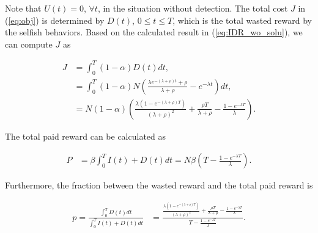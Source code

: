 Note that $U(t)=0$, $\forall t$,
in the situation without detection.
The total cost $J$ in (\ref{eq:obj}) is determined by $D(t)$, $0 \le t \le T$,
which is the total wasted reward by the selfish behaviors.
Based on the calculated result in (\ref{eq:IDR_wo_solu}),
we can compute $J$ as
\begin{small}
\begin{equation}
\label{eq:IDR_wo_J}
\begin{aligned}
J &= \int_{0}^{T} (1-\alpha) D(t) dt, \\
&= \int_{0}^{T} (1-\alpha) N (\frac{\lambda e^{-(\lambda + \rho)t} + \rho}{ \lambda + \rho } - e^{- \lambda t}) dt, \\
&= N (1-\alpha) \left( \frac{\lambda (1-e^{-(\lambda+\rho)T})}{ (\lambda + \rho)^{2} }
+ \frac{\rho T}{\lambda + \rho}
- \frac{1-e^{-\lambda T}}{\lambda} \right).
\end{aligned}
\end{equation}
\end{small}
The total paid reward can be calculated as
\begin{small}
\begin{equation}
\nonumber
\begin{aligned}
P &= \beta \int_{0}^{T} I(t) + D(t) dt
= N \beta (T - \frac{ 1 - e^{-\lambda T} }{\lambda} ).
\end{aligned}
\end{equation}
\end{small}
Furthermore, the fraction between the wasted reward and the total paid reward is
\begin{small}
\begin{equation}
\nonumber
\begin{aligned}
p = \frac{\int_{0}^{T} D(t) dt}{\int_{0}^{T} I(t) + D(t) dt}
&= \frac{ \frac{\lambda (1-e^{-(\lambda+\rho)T})}{ (\lambda + \rho)^{2} }
+ \frac{\rho T}{\lambda + \rho}
- \frac{1-e^{-\lambda T}}{\lambda} }
{T - \frac{ 1 - e^{-\lambda T} }{\lambda} }.
\end{aligned}
\end{equation}
\end{small}

